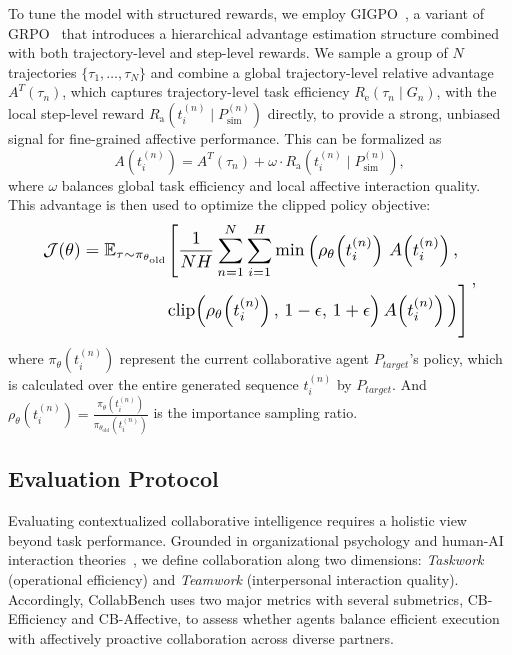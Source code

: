 \documentclass{article}
\theoremstyle{plain}
\theoremstyle{definition}
\theoremstyle{remark}
\begin{document}
To tune the model with structured rewards, we employ GIGPO~\cite{feng2025group}, a variant of GRPO~\cite{guo2025deepseek} that introduces a hierarchical advantage estimation structure combined with both trajectory-level and step-level rewards. We sample a group of $N$ trajectories $\{\tau_1,\dots,\tau_N\}$ and combine a global trajectory-level relative advantage $A^T(\tau_n)$, which captures trajectory-level task efficiency $R_{\text{e}}(\tau_n \mid G_n)$, with the local step-level reward $R_{\text{a}}(t^{(n)}_i \mid P^{(n)}_{\text{sim}})$ directly, to provide a strong, unbiased signal for fine-grained affective performance. This can be formalized as
\begin{equation}
    A(t^{(n)}_i) = A^T(\tau_n) + \omega \cdot R_{\text{a}}(t^{(n)}_i \mid P^{(n)}_{\text{sim}}),
\end{equation}
where $\omega$ balances global task efficiency and local affective interaction quality. This advantage is then used to optimize the clipped policy objective:
\begin{equation}
\resizebox{.90\linewidth}{!}{$
        \displaystyle
\begin{aligned}
\mathcal{J}(\theta) =
\mathbb{E}_{\tau \sim \pi_{\theta_{\text{old}}}} &\Bigg[ \frac{1}{NH} \sum_{n=1}^{N} \sum_{i=1}^{H} 
\min \Big( 
 \rho_{\theta}\!\left(t_i^{(n)}\right)\, A\!\left(t_i^{(n)}\right), \\
& \mathrm{clip}\!\left(\rho_{\theta}\!\left(t_i^{(n)}\right),\, 1 - \epsilon,\, 1 + \epsilon \right)
A\!\left(t_i^{(n)}\right) 
\Big) \Bigg]
\end{aligned}\,,
$}
\end{equation}
where $\pi_{\theta}(t_i^{(n)})$ represent the current collaborative agent $P_{target}$'s policy, which is calculated over the entire generated sequence $t_i^{(n)}$ by $P_{target}$. And $\rho_\theta(t_i^{(n)}) = \frac{\pi_\theta(t_i^{(n)})}{\pi_{\theta_{\text{old}}}(t_i^{(n)})}$ is the importance sampling ratio. 

\subsection{Evaluation Protocol}













Evaluating contextualized collaborative intelligence requires a holistic view beyond task performance. Grounded in organizational psychology and human-AI interaction theories~\cite{george1990personality,mcallister1995affect,salas2005there}, we define collaboration along two dimensions: \emph{Taskwork} (operational efficiency) and \emph{Teamwork} (interpersonal interaction quality). Accordingly, CollabBench uses two major metrics with several submetrics, CB-Efficiency and CB-Affective, to assess whether agents balance efficient execution with affectively proactive collaboration across diverse partners.
\end{document}
